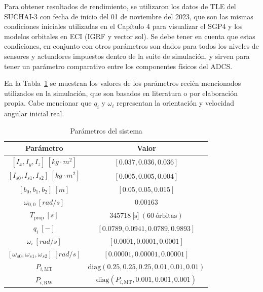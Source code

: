 Para obtener resultados de rendimiento, se utilizaron los datos de TLE del SUCHAI-3 con fecha de inicio del 01 de noviembre del 2023, que son las mismas condiciones iniciales utilizadas en el Capítulo 4 para visualizar el SGP4 y los modelos orbitales en ECI (IGRF y vector sol). Se debe tener en cuenta que estas condiciones, en conjunto con otros parámetros son dados para todos los niveles de sensores y actuadores impuestos dentro de la suite de simulación, y sirven para tener un parámetro comparativo entre los componentes físicos del ADCS.

En la Tabla~\ref{tab:parametros} se muestran los valores de los parámetros recién mencionados utilizados en la simulación, que son basados en literatura \cite{ref14,ref41,ref44} o por elaboración propia. Cabe mencionar que $q_i$ y $\omega_i$ representan la orientación y velocidad angular inicial real.

\begin{table}[h!]
	\centering
	\caption{Parámetros del sistema}
	\begin{tabular}{|c|c|}
		\hline
		\textbf{Parámetro} & \textbf{Valor} \\
		\hline
		$[I_x, I_y, I_z] \ [kg \cdot m^2]$ & $[0.037, 0.036, 0.036]$ \\
		\hline		
		$[I_{s0}, I_{s1}, I_{s2}] \ [kg \cdot m^2]$ & $[0.005, 0.005, 0.004]$ \\
		\hline
		$[b_0, b_1, b_2] \ [m]$ & $[0.05, 0.05, 0.015]$ \\
		\hline		
		$\omega_{0,0} \ [rad/s]$ & $0.00163$ \\
		\hline
		$T_{\text{prop}} \ [s]$ & $345718 \ \text{[s]} \ (60 \ \text{órbitas})$ \\
		\hline
		$q_i \ [-]$ & $\left[ 0.0789, 0.0941, 0.0789, 0.9893 \right]$ \\
		\hline
		$\omega_i \ [rad/s]$ & $[0.0001, 0.0001, 0.0001]$ \\
		\hline
		$[\omega_{s0}, \omega_{s1}, \omega_{s2}] \ [rad/s]$ & $[0.00001, 0.00001, 0.00001]$ \\
		\hline
		$P_{i, \text{MT}}$ & $\text{diag}(0.25, 0.25, 0.25, 0.01, 0.01, 0.01)$ \\
		\hline
		$P_{i, \text{RW}}$ & $\text{diag}(P_{i, \text{MT}}, 0.001, 0.001, 0.001)$ \\
		\hline
	\end{tabular}

	\label{tab:parametros}
\end{table}


